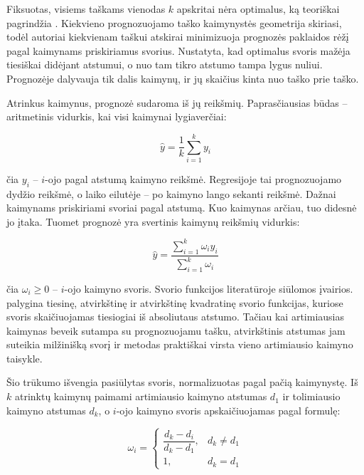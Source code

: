 Fiksuotas, visiems taškams vienodas $k$ apskritai nėra optimalus, ką teoriškai pagrindžia \cite{anava2016}.
Kiekvieno prognozuojamo taško kaimynystės geometrija skiriasi, todėl autoriai kiekvienam taškui atskirai minimizuoja prognozės paklaidos rėžį pagal kaimynams priskiriamus svorius.
Nustatyta, kad optimalus svoris mažėja tiesiškai didėjant atstumui, o nuo tam tikro atstumo tampa lygus nuliui.
Prognozėje dalyvauja tik dalis kaimynų, ir jų skaičius kinta nuo taško prie taško.

Atrinkus kaimynus, prognozė sudaroma iš jų reikšmių.
Paprasčiausias būdas -- aritmetinis vidurkis, kai visi kaimynai lygiaverčiai:

\begin{equation}
    \hat{y} = \frac{1}{k} \sum_{i=1}^{k} y_i
    \label{eq:kaimynu-vidurkis}
\end{equation}

čia $y_i$ -- $i$-ojo pagal atstumą kaimyno reikšmė.
Regresijoje tai prognozuojamo dydžio reikšmė, o laiko eilutėje -- po kaimyno lango sekanti reikšmė.
Dažnai kaimynams priskiriami svoriai pagal atstumą.
Kuo kaimynas arčiau, tuo didesnė jo įtaka.
Tuomet prognozė yra svertinis kaimynų reikšmių vidurkis:

\begin{equation}
    \hat{y} = \frac{\sum_{i=1}^{k} \omega_i y_i}{\sum_{i=1}^{k} \omega_i}
    \label{eq:svertinis-vidurkis}
\end{equation}

čia $\omega_i \geq 0$ -- $i$-ojo kaimyno svoris.
Svorio funkcijos literatūroje siūlomos įvairios.
\cite{zamani2008} palygina tiesinę, atvirkštinę ir atvirkštinę kvadratinę svorio funkcijas, kuriose svoris skaičiuojamas tiesiogiai iš absoliutaus atstumo.
Tačiau kai artimiausias kaimynas beveik sutampa su prognozuojamu tašku, atvirkštinis atstumas jam suteikia milžinišką svorį ir metodas praktiškai virsta vieno artimiausio kaimyno taisykle.

Šio trūkumo išvengia \cite{dudani976} pasiūlytas svoris, normalizuotas pagal pačią kaimynystę.
Iš $k$ atrinktų kaimynų paimami artimiausio kaimyno atstumas $d_1$ ir tolimiausio kaimyno atstumas $d_k$, o $i$-ojo kaimyno svoris apskaičiuojamas pagal formulę:

\begin{equation}
    \omega_i =
    \begin{cases}
        \dfrac{d_k - d_i}{d_k - d_1}, & d_k \neq d_1 \\[2ex]
        1, & d_k = d_1
    \end{cases}
    \label{eq:wknn-svoris}
\end{equation}

